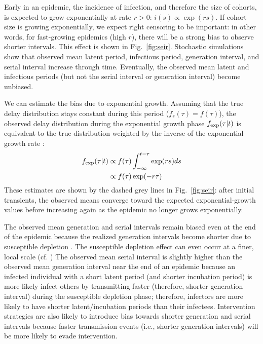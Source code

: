\documentclass[12pt]{article}
\newcommand{\fref}[1]{Fig.~\ref{fig:#1}}
\newcommand{\comment}[3]{\textcolor{#1}{\textbf{[#2: }\textsl{#3}\textbf{]}}}
\newcommand{\jd}[1]{\comment{cyan}{JD}{#1}}
\begin{document}
Early in an epidemic, the incidence of infection, and therefore the size of cohorts, is expected to grow exponentially at rate $r > 0$: $i(s) \propto \exp(rs)$.
If cohort size is growing exponentially, we expect right censoring to be important: in other words, for fast-growing epidemics (high $r$), there will be a strong bias to observe shorter intervals.
This effect is shown in \fref{seir}. 
Stochastic simulations show that observed mean latent period, infectious period, generation interval, and serial interval increase through time. 
Eventually, the observed mean latent and infectious periods (but not the serial interval or generation interval) become unbiased.


We can estimate the bias due to exponential growth.
Assuming that the true delay distribution stays constant during this period ($f_s(\tau) = f(\tau)$), 
the observed delay distribution during the exponential growth phase $f_{\tiny\textrm{exp}}(\tau|t)$ is equivalent to the true distribution weighted by the inverse of the exponential growth rate \citep{britton2019estimation}:
\begin{equation}
\begin{aligned}
f_{\tiny\textrm{exp}}(\tau|t) &\propto f(\tau) \int_{-\infty}^{t-\tau} \exp(rs) ds\\
&\propto f(\tau) \exp(-r\tau) \\
\end{aligned}
\end{equation}
These estimates are shown by the dashed grey lines in \fref{seir}: after initial transients, the observed means converge toward the expected exponential-growth values before increasing again as the epidemic no longer grows exponentially. %

The observed mean generation and serial intervals remain biased even at the end of the epidemic because the realized generation intervals become shorter due to susceptible depletion \citep{champredon2015intrinsic}.
The susceptible depletion effect can even occur at a finer, local scale (cf. \cite{park2019inferring})
The observed mean serial interval is slightly higher than the observed mean generation interval near the end of an epidemic because an infected individual with a short latent period (and shorter incubation period) is more likely infect others by transmitting faster (therefore, shorter generation interval) during the susceptible depletion phase; therefore, infectors are more likely to have shorter latent/incubation periods than their infectees.
Intervention strategies are also likely to introduce bias towards shorter generation and serial intervals because faster transmission events (i.e., shorter generation intervals) will be more likely to evade intervention.
\end{document}
